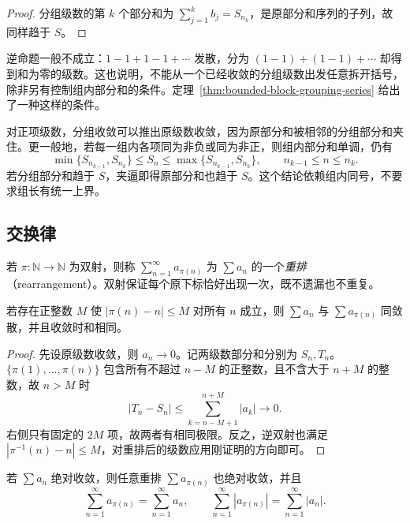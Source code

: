 \documentclass[UTF8,12pt,a4paper,fontset=fandol]{ctexbook}
\begin{document}
\begin{proof}
分组级数的第 $k$ 个部分和为 $\sum_{j=1}^k b_j=S_{n_k}$，是原部分和序列的子列，故同样趋于 $S$。
\end{proof}

逆命题一般不成立：$1-1+1-1+\cdots$ 发散，分为 $(1-1)+(1-1)+\cdots$ 却得到和为零的级数。这也说明，不能从一个已经收敛的分组级数出发任意拆开括号，除非另有控制组内部分和的条件。定理~\ref{thm:bounded-block-grouping-series} 给出了一种这样的条件。

对正项级数，分组收敛可以推出原级数收敛，因为原部分和被相邻的分组部分和夹住。更一般地，若每一组内各项同为非负或同为非正，则组内部分和单调，仍有
\[
    \min\{S_{n_{k-1}},S_{n_k}\}\leq S_n
       \leq\max\{S_{n_{k-1}},S_{n_k}\},
    \qquad n_{k-1}\leq n\leq n_k.
\]
若分组部分和趋于 $S$，夹逼即得原部分和也趋于 $S$。这个结论依赖组内同号，不要求组长有统一上界。

\subsection{交换律}
\label{subsec:commutativity-of-series}

\begin{definition}
若 $\pi:\mathbb N\to\mathbb N$ 为双射，则称 $\sum_{n=1}^{\infty}a_{\pi(n)}$ 为 $\sum a_n$ 的一个\emph{重排}（rearrangement）。双射保证每个原下标恰好出现一次，既不遗漏也不重复。
\end{definition}

\begin{theorem}[有界位移重排]
\label{thm:bounded-displacement-rearrangement}
若存在正整数 $M$ 使 $|\pi(n)-n|\leq M$ 对所有 $n$ 成立，则 $\sum a_n$ 与 $\sum a_{\pi(n)}$ 同敛散，并且收敛时和相同。
\end{theorem}

\begin{proof}
先设原级数收敛，则 $a_n\to0$。记两级数部分和分别为 $S_n,T_n$。$\{\pi(1),\ldots,\pi(n)\}$ 包含所有不超过 $n-M$ 的正整数，且不含大于 $n+M$ 的整数，故 $n>M$ 时
\[
    |T_n-S_n|\leq\sum_{k=n-M+1}^{n+M}|a_k|\longrightarrow0.
\]
右侧只有固定的 $2M$ 项，故两者有相同极限。反之，逆双射也满足 $|\pi^{-1}(n)-n|\leq M$，对重排后的级数应用刚证明的方向即可。
\end{proof}

\begin{theorem}[绝对收敛级数的重排]
\label{thm:absolutely-convergent-series-rearrangement}
若 $\sum a_n$ 绝对收敛，则任意重排 $\sum a_{\pi(n)}$ 也绝对收敛，并且
\[
    \sum_{n=1}^{\infty}a_{\pi(n)}=\sum_{n=1}^{\infty}a_n,
    \qquad
    \sum_{n=1}^{\infty}|a_{\pi(n)}|=\sum_{n=1}^{\infty}|a_n|.
\]
\end{theorem}
\end{document}
